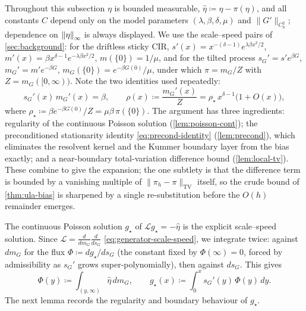 \documentclass[aap,preprint]{imsart}
\DeclarePairedDelimiter{\Vpair}{\|}{\|} %
\newcommand\norm[2][0pt]{\Vpair*{#2}} %
\newcommand\snorm[1]{\norm{\smash{#1}}} %
\numberwithin{equation}{section}
\theoremstyle{plain}
\theoremstyle{definition}
\begin{document}
Throughout this subsection $\eta$ is bounded measurable, $\hat\eta\coloneqq \eta-\pi(\eta)$, and all constants $C$ depend only on the model parameters $(\lambda,\beta,\delta,\mu)$ and $\|G'\|_{C^2_{\mathrm b}}$; dependence on $\snorm{\eta}_\infty$ is always displayed.  We use the scale--speed pairs of \cref{sec:background}: for the driftless sticky CIR, $s'(x)=x^{-(\delta-1)}e^{\lambda\beta x^2/2}$, $m'(x)=\beta x^{\delta-1}e^{-\lambda\beta x^2/2}$, $m(\{0\})=1/\mu$, and for the tilted process $s_G'=s'e^{\beta G}$, $m_G'=m'e^{-\beta G}$, $m_G(\{0\})=e^{-\beta G(0)}/\mu$, under which $\pi=m_G/Z$ with $Z=m_G([0,\infty))$.  Note the two identities used repeatedly:
\begin{equation}\label{eq:sm-identities}
  s_G'(x)\,m_G'(x)=\beta,
  \qquad
  \rho(x)\coloneqq \frac{m_G'(x)}{Z}=\rho_\star\,x^{\delta-1}\bigl(1+O(x)\bigr),
\end{equation}
where $\rho_\star\coloneqq \beta e^{-\beta G(0)}/Z=\mu\beta\,\pi(\{0\})$.
The argument has three ingredients: regularity of the continuous Poisson solution (\cref{lem:poisson-cont}); the preconditioned stationarity identity \cref{eq:precond-identity} (\cref{lem:precond}), which eliminates the resolvent kernel  and the Kummer boundary layer from the bias exactly; and a near-boundary total-variation difference bound (\cref{lem:local-tv}).  These combine to give the expansion; the one subtlety is that the difference term is bounded by a vanishing multiple of $\|\pi_h-\pi\|_{\mathrm{TV}}$ itself, so the crude bound of \cref{thm:ula-bias} is sharpened by a single re-substitution before the $O(h)$ remainder emerges.

The continuous Poisson solution $g_\star$ of $\mathcal Lg_\star=-\hat\eta$ is the explicit scale--speed solution.  Since $\mathcal L=\frac{d}{dm_G}\frac{d}{ds_G}$ \eqref{eq:generator-scale-speed}, we integrate twice: against $dm_G$ for the flux $\Phi\coloneqq dg_\star/ds_G$ (the constant fixed by $\Phi(\infty)=0$, forced by admissibility as $s_G'$ grows super-polynomially), then against $ds_G$. This gives
\begin{equation}\label{eq:pois-rep}
  \Phi(y)\coloneqq \int_{(y,\infty)}\hat\eta\,dm_G,
  \qquad
  g_\star(x)\coloneqq \int_0^x s_G'(y)\,\Phi(y)\,dy .
\end{equation}
The next lemma records the regularity and boundary behaviour of $g_\star$.
\end{document}
